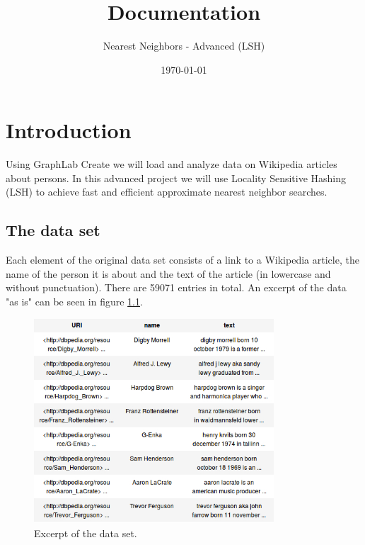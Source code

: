 \documentclass[12pt]{scrreprt}
\begin{document}
\subject{Data Science}
\title{Documentation}
\subtitle{Nearest Neighbors - Advanced (LSH)}
\author{}
\date{\large{\today}}
\publishers{Eicker Niklas, Halastra Szymon}
\maketitle
\tableofcontents



\chapter{Introduction} 
\label{chpt:intro}

Using GraphLab Create we will load and analyze data on Wikipedia articles about persons. In this advanced project we will use Locality Sensitive Hashing (LSH) to achieve fast and efficient approximate nearest neighbor searches.

\section{The data set}
\label{sec:data}

Each element of the original data set consists of a link to a Wikipedia article, the name of the person it is about and the text of the article (in lowercase and without punctuation). There are 59071 entries in total. An excerpt of the data "as is" can be seen in figure \ref{fig:dataset_raw}.\\


\begin{figure}[H]
  \begin{center}
    \caption{Excerpt of the data set.}
    \label{fig:dataset_raw}
    \includegraphics[width=0.8\textwidth, angle=0]{raw_data.jpg}
  \end{center}
\end{figure}
\end{document}
